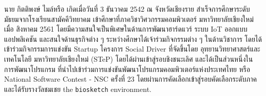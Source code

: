 \documentclass[semifinal]{cpecmu}
\begin{document}
\begin{biosketch}
\begin{center}
\end{center}
นาย กิตติพงษ์ ไมล์หรือ เกิดเมื่อวันที่ 3 ธันวาคม 2542 ณ จังหวัดเชียงราย สำเร็จการศึกษาระดับมัธยมจากโรงเรียนสามัคคีวิทยาคม เข้าศึกษาที่ภาควิชาวิศวกรรมคอมพิวเตอร์ มหาวิทยาลัยเชียงใหม่ เมื่อ สิงหาคม 2561 โดยมีความสนใจเป็นพิเศษในด้านการพัฒนาฮาร์ดแวร์ ระบบ IoT ออกแบบแอปพลิเคชัน และสนใจด้านธุรกิจต่าง ๆ\newline 
ระหว่างศึกษาได้เจ้าร่วมกิจกรรมต่าง ๆ ในด้านวิชาการ  โดยได้เข้าร่วมกิจกรรมการแข่งขัน Startup โครงการ Social Driver ที่จัดขึ้นโดย อุทยานวิทยาศาสตร์และเทคโนโลยี มหาวิทยาลัยเชียงใหม่ (STeP) โดยได้ผ่านเข้าสู่รอบชิงชนะเลิศ และได้เป็นส่วนหนึ่งในการพัฒนาโปรแกรม ที่นำไปเข้าร่วมการแข่งขันพัฒนาโปรแกรมคอมพิวเตอร์แห่งประเทศไทย 
หรือ National Software Contest - NSC ครั้งที่ 23 โดยผ่านการคัดเลือกเข้าสู่รอบคัดเลือกระดับภาคและได้รับรางวัลชมเชย
the \texttt{biosketch} environment.

\end{biosketch}
\fi %
\end{document}
